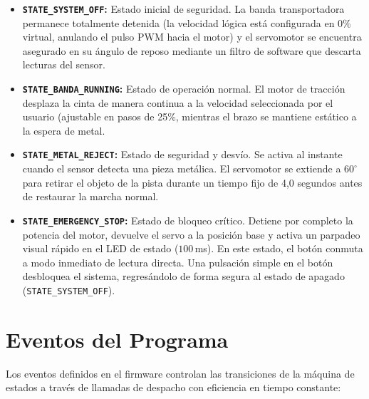 \documentclass[12pt, letterpaper]{article}
\begin{document}
\begin{itemize}
    \item \textbf{\texttt{STATE\_SYSTEM\_OFF}:} Estado inicial de seguridad. La banda transportadora permanece totalmente detenida (la velocidad lógica está configurada en 0\% virtual, anulando el pulso PWM hacia el motor) y el servomotor se encuentra asegurado en su ángulo de reposo mediante un filtro de software que descarta lecturas del sensor.
    \item \textbf{\texttt{STATE\_BANDA\_RUNNING}:} Estado de operación normal. El motor de tracción desplaza la cinta de manera continua a la velocidad seleccionada por el usuario (ajustable en pasos de 25\%, mientras el brazo se mantiene estático a la espera de metal.
    \item \textbf{\texttt{STATE\_METAL\_REJECT}:} Estado de seguridad y desvío. Se activa al instante cuando el sensor detecta una pieza metálica. El servomotor se extiende a $60^\circ$ para retirar el objeto de la pista durante un tiempo fijo de 4,0 segundos antes de restaurar la marcha normal.
    \item \textbf{\texttt{STATE\_EMERGENCY\_STOP}:} Estado de bloqueo crítico. Detiene por completo la potencia del motor, devuelve el servo a la posición base y activa un parpadeo visual rápido en el LED de estado ($100\,$ms). En este estado, el botón conmuta a modo inmediato de lectura directa. Una pulsación simple en el botón desbloquea el sistema, regresándolo de forma segura al estado de apagado (\texttt{STATE\_SYSTEM\_OFF}).
\end{itemize}

\section{Eventos del Programa}
\label{sec:eventos_preliminares}

Los eventos definidos en el firmware controlan las transiciones de la máquina de estados a través de llamadas de despacho con eficiencia en tiempo constante:
\end{document}
